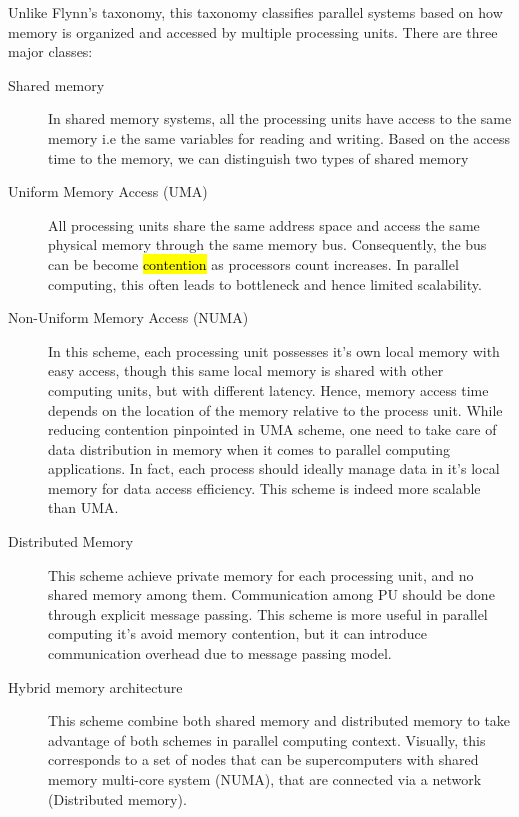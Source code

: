 Unlike Flynn's taxonomy, this taxonomy classifies parallel systems based on how memory is organized and accessed by multiple processing units. There are three major classes:


\begin{description}

\item[Shared memory] In shared memory systems, all the processing units have access to the same memory i.e the same variables for reading and writing. Based on the access time to the memory, we can distinguish two types of shared memory

\item[Uniform Memory Access (UMA)] All processing units share the same address space and access the same physical memory through the same memory bus. Consequently, the bus can be become \hl{contention} as processors count increases. In parallel computing, this often leads to bottleneck and hence limited scalability. 

\item[Non-Uniform Memory Access (NUMA)] In this scheme, each processing unit possesses it's own local memory with easy access, though this same local memory is shared with other computing units, but with different latency. Hence, memory access time depends on the location of the memory relative to the process unit. While reducing contention pinpointed in UMA scheme, one need to take care of data distribution in memory when it comes to parallel computing applications. In fact, each process should ideally manage data in it's local memory for data access efficiency. This scheme is indeed more scalable than UMA.

\item[Distributed Memory] This scheme achieve private memory for each processing unit, and no shared memory among them. Communication among PU should be done through explicit message passing. This scheme is more useful in parallel computing it's avoid memory contention, but it can introduce communication overhead due to message passing model.

\item[Hybrid memory architecture] This scheme combine both shared memory and distributed memory to take advantage of both schemes in parallel computing context. Visually, this corresponds to a set of nodes that can be supercomputers with shared memory multi-core system (NUMA), that are connected via a network (Distributed memory).

\end{description}


